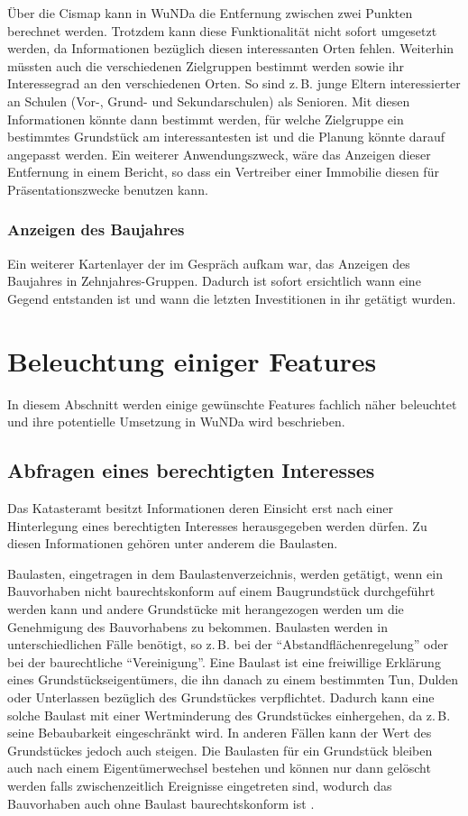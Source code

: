 Über die Cismap kann in \ac{WuNDa} die Entfernung zwischen zwei Punkten berechnet werden.
Trotzdem kann diese Funktionalität nicht sofort umgesetzt werden, da Informationen bezüglich diesen interessanten Orten fehlen.
Weiterhin müssten auch die verschiedenen Zielgruppen bestimmt werden sowie ihr Interessegrad an den verschiedenen Orten.
So sind z.\,B. junge Eltern interessierter an Schulen (Vor-, Grund- und Sekundarschulen) als Senioren.
Mit diesen Informationen könnte dann bestimmt werden, für welche Zielgruppe ein bestimmtes Grundstück am interessantesten ist und die Planung könnte darauf angepasst werden.
Ein weiterer Anwendungszweck, wäre das Anzeigen dieser Entfernung in einem Bericht, so dass ein Vertreiber einer Immobilie diesen für Präsentationszwecke benutzen kann.

\subsubsection{Anzeigen des Baujahres}
Ein weiterer Kartenlayer der im Gespräch aufkam war, das Anzeigen des Baujahres in Zehnjahres-Gruppen.
Dadurch ist sofort ersichtlich wann eine Gegend entstanden ist und wann die letzten Investitionen in ihr getätigt wurden.


\section{Beleuchtung einiger Features}

In diesem Abschnitt werden einige gewünschte Features fachlich näher beleuchtet und ihre potentielle Umsetzung in \ac{WuNDa} wird beschrieben.

\subsection{Abfragen eines berechtigten Interesses}
\label{subsec:berechtigtes-interesse}
Das Katasteramt besitzt Informationen deren Einsicht erst nach einer Hinterlegung eines berechtigten Interesses herausgegeben werden dürfen.
Zu diesen Informationen gehören unter anderem die Baulasten.

Baulasten, eingetragen in dem Baulastenverzeichnis, werden getätigt, wenn ein Bauvorhaben nicht baurechtskonform auf einem Baugrundstück durchgeführt werden kann und andere Grundstücke mit herangezogen werden um die Genehmigung des Bauvorhabens zu bekommen.
Baulasten werden in unterschiedlichen Fälle benötigt, so z.\,B. bei der \enquote{Abstandflächenregelung} oder bei der baurechtliche \enquote{Vereinigung}.
Eine Baulast ist eine freiwillige Erklärung eines Grundstückseigentümers, die ihn danach zu einem bestimmten Tun, Dulden oder Unterlassen bezüglich des Grundstückes verpflichtet.
Dadurch kann eine solche Baulast mit einer Wertminderung des Grundstückes einhergehen, da z.\,B. seine Bebaubarkeit eingeschränkt wird.
In anderen Fällen kann der Wert des Grundstückes jedoch auch steigen.
Die Baulasten für ein Grundstück bleiben auch nach einem Eigentümerwechsel bestehen und können nur dann gelöscht werden falls zwischenzeitlich Ereignisse eingetreten sind, wodurch das Bauvorhaben auch ohne Baulast baurechtskonform ist \autocite[vgl.][]{herne-baulasten}.

